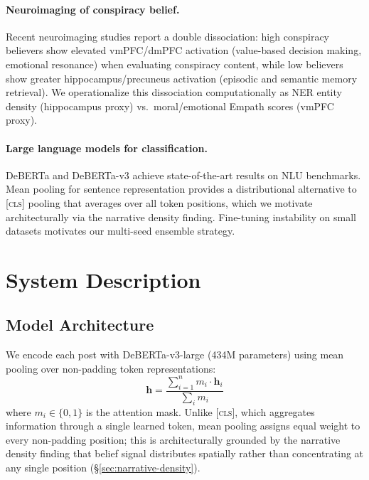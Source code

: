 \documentclass[11pt]{article}
\begin{document}
\paragraph{Neuroimaging of conspiracy belief.}
Recent neuroimaging studies
\citep{sirigu2025neural} report a double dissociation: high conspiracy
believers show elevated vmPFC/dmPFC activation (value-based decision
making, emotional resonance) when evaluating conspiracy content, while
low believers show greater hippocampus/precuneus activation (episodic
and semantic memory retrieval).
We operationalize this dissociation computationally as NER entity density
(hippocampus proxy) vs.\ moral/emotional Empath scores (vmPFC proxy).

\paragraph{Large language models for classification.}
DeBERTa \citep{he2021deberta} and DeBERTa-v3 \citep{he2021debertav3}
achieve state-of-the-art results on NLU benchmarks.
Mean pooling for sentence representation
\citep{reimers2019sentencebert} provides a distributional alternative to
\textsc{[cls]} pooling that averages over all token positions, which
we motivate architecturally via the narrative density finding.
Fine-tuning instability on small datasets
\citep{dodge2020finetuning,mosbach2021stability} motivates our
multi-seed ensemble strategy.

\section{System Description}
\label{sec:system}

\subsection{Model Architecture}

We encode each post with DeBERTa-v3-large (434M parameters) using mean
pooling over non-padding token representations:
\begin{equation}
  \mathbf{h} = \frac{\displaystyle\sum_{i=1}^{n} m_i \cdot \mathbf{h}_i}
                    {\displaystyle\sum_i m_i}
  \label{eq:meanpool}
\end{equation}
where $m_i \in \{0,1\}$ is the attention mask.
Unlike \textsc{[cls]}, which aggregates information through a single
learned token, mean pooling assigns equal weight to every non-padding
position; this is architecturally grounded by the narrative density
finding that belief signal distributes spatially rather than
concentrating at any single position (\S\ref{sec:narrative-density}).
\end{document}
